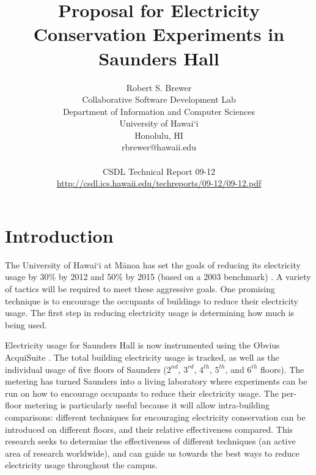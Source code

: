 \documentclass[11pt]{article}
\begin{document}
\title{Proposal for Electricity Conservation Experiments in Saunders Hall}
\author{Robert S. Brewer \\
Collaborative Software Development Lab \\
Department of Information and Computer Sciences \\
University of Hawai`i \\
Honolulu, HI \\
rbrewer@hawaii.edu \\
\\
CSDL Technical Report 09-12 \\
\url{http://csdl.ics.hawaii.edu/techreports/09-12/09-12.pdf}
}

\maketitle



\section{Introduction}

The University of Hawai`i at M\=anoa has set the goals of reducing its electricity usage by 30\% by 2012 and 50\% by 2015 (based on a 2003 benchmark) \cite{Moreno2006UHM-energy-goals, 2007UHM-HECO-pr}. A variety of tactics will be required to meet these aggressive goals. One promising technique is to encourage the occupants of buildings to reduce their electricity usage. The first step in reducing electricity usage is determining how much is being used.

Electricity usage for Saunders Hall is now instrumented using the Obvius AcquiSuite \cite{ObviusAcquiSuite}. The total building electricity usage is tracked, as well as the individual usage of five floors of Saunders ($2^{nd}$, $3^{rd}$, $4^{th}$, $5^{th}$, and $6^{th}$ floors). The metering has turned Saunders into a living laboratory where experiments can be run on how to encourage occupants to reduce their electricity usage. The per-floor metering is particularly useful because it will allow intra-building comparisons: different techniques for encouraging electricity conservation can be introduced on different floors, and their relative effectiveness compared. This research seeks to determine the effectiveness of different techniques (an active area of research worldwide), and can guide us towards the best ways to reduce electricity usage throughout the campus.
\end{document}
